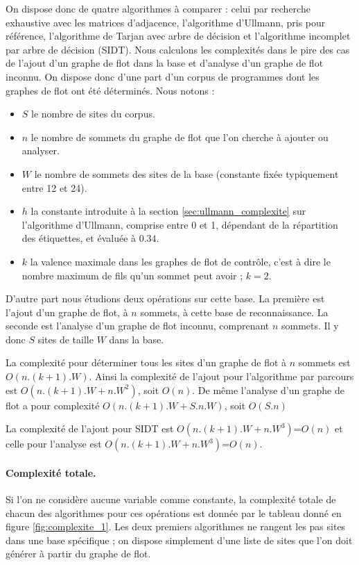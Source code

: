 On dispose donc de quatre algorithmes à comparer : celui par recherche exhaustive avec les matrices d'adjacence, l'algorithme d'Ullmann, pris pour référence, l'algorithme de Tarjan avec arbre de décision et l'algorithme incomplet par arbre de décision (SIDT).
Nous calculons les complexités dans le pire des cas de l'ajout d'un graphe de flot dans la base et d'analyse d'un graphe de flot inconnu.
On dispose donc d'une part d'un corpus de programmes dont les graphes de flot ont été déterminés.
Nous notons :
\begin{itemize}
 \item $S$ le nombre de sites du corpus.
 \item $n$ le nombre de sommets du graphe de flot que l'on cherche à ajouter ou analyser.
 \item $W$ le nombre de sommets des sites de la base (constante fixée typiquement entre 12 et 24).
 \item $h$ la constante introduite à la section \ref{sec:ullmann_complexite} sur l'algorithme d'Ullmann, comprise entre 0 et 1, dépendant de la répartition des étiquettes, et évaluée à $0.34$.
 \item $k$ la valence maximale dans les graphes de flot de contrôle, c'est à dire le nombre maximum de fils qu'un sommet peut avoir ; $k=2$.
\end{itemize}
D'autre part nous étudions deux opérations sur cette base.
La première est l'ajout d'un graphe de flot, à $n$ sommets, à cette base de reconnaissance.
La seconde est l'analyse d'un graphe de flot inconnu, comprenant $n$ sommets.
Il y donc $S$ sites de taille $W$ dans la base.

La complexité pour déterminer tous les sites d'un graphe de flot à $n$ sommets est $O(n.(k+1).W)$.
Ainsi la complexité de l'ajout pour l'algorithme par parcours est $O(n.(k+1).W+n.W^2)$, soit $O(n)$.
De même l'analyse d'un graphe de flot a pour complexité $O(n.(k+1).W+S.n.W)$, soit $O(S.n)$

La complexité de l'ajout pour SIDT est $O(n.(k+1).W+n.W^3)$=$O(n)$ et celle pour l'analyse est $O(n.(k+1).W+n.W^3)$=$O(n)$.

\paragraph{Complexité totale.}
Si l'on ne considère aucune variable comme constante, la complexité totale de chacun des algorithmes pour ces opérations est donnée par le tableau donné en figure \ref{fig:complexite_1}.
Les deux premiers algorithmes ne rangent les pas sites dans une base spécifique ; on dispose simplement d'une liste de sites que l'on doit générer à partir du graphe de flot.


